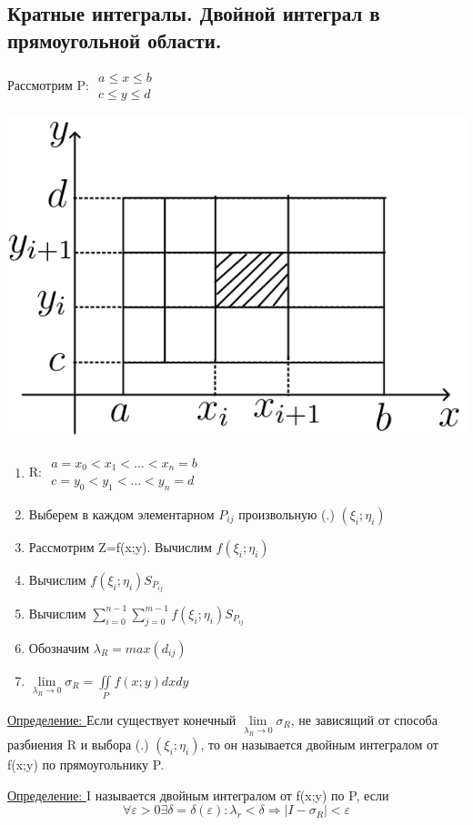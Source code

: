 \documentclass[12pt]{article}
\let\ORIincludegraphics\includegraphics
\renewcommand{\includegraphics}[2][]{\ORIincludegraphics[scale=0.65,#1]{#2}}
\let\oldiint\iint
\let\oldsum\sum
\let\oldlim\lim
\renewcommand{\iint}{\oldiint\limits}
\renewcommand{\sum}{\oldsum\limits}
\renewcommand{\lim}{\oldlim\limits}
\begin{document}
  \subsection{Кратные интегралы. Двойной интеграл в прямоугольной области.}
  \begin{minipage}{0.25\textwidth}
    Рассмотрим P: $\begin{matrix}
      a\leq x \leq b\\
      c \leq y \leq d
    \end{matrix}$
  \end{minipage}
  \hspace{1em}
  \begin{minipage}{0.45\textwidth}
    \includegraphics[scale=0.6]{8.10.1.png}
  \end{minipage}
  \vspace{1em}
  \par
  \begin{enumerate}
    \item R: $\begin{matrix}
      a=x_0 < x_1 < \dots < x_n =b\\
      c=y_0 <y_1 < \dots < y_n =d
    \end{matrix}$
    \item Выберем в каждом элементарном $P_{ij}$ произвольную (.) $(\xi_i;\eta_i)$
    \item Рассмотрим Z=f(x;y). Вычислим $f(\xi_i;\eta_i)$
    \item Вычислим $f(\xi_i;\eta_i)S_{P_{ij}}$
    \item Вычислим $\sum_{i=0}^{n-1} \sum_{j=0}^{m-1} f (\xi_i;\eta_i)S_{P_{ij}}$
    \item Обозначим $\lambda_R = max(d_{ij})$
    \item $\lim_{\lambda_R \to 0}\sigma_R=\iint_P f(x;y)dxdy$
  \end{enumerate}
  \underline{Определение: } Если существует конечный $\lim_{\lambda_R \to 0} \sigma_R$, не зависящий
  от способа разбиения R и выбора (.) $(\xi_i;\eta_i)$, то он называется двойным интегралом от f(x;y)
  по прямоугольнику P.\\
  \par\noindent
  \underline{Определение: } I называется двойным интегралом от f(x;y) по P, если 
  \[\forall \varepsilon > 0 \exists \delta =\delta(\varepsilon): \lambda_r < \delta \Rightarrow |I-\sigma_R| < \varepsilon\]
\end{document}
